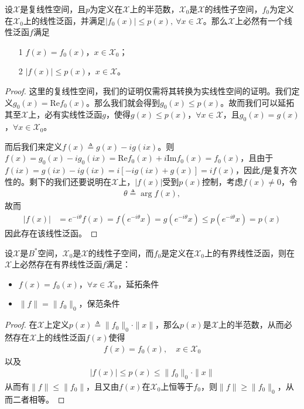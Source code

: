 \begin{theorem}
    设$\mathscr{X}$是复线性空间，且$p$为定义在$\mathscr{X}$上的半范数，$\mathscr{X}_0$是$\mathscr{X}$的线性子空间，$f_0$为定义在$\mathscr{X}_0$上的线性泛函，并满足$|f_0(x)| \leqslant p(x),\ \forall x\in\mathscr{X}$。那么$\mathscr{X}$上必然有一个线性泛函$f$满足
    \begin{itemize}
        \item[1] $f(x) = f_0(x)$，$x\in\mathscr{X}_0$；
        \item[2] $|f(x)| \leqslant p(x)$，$x\in\mathscr{X}$。
    \end{itemize}
\end{theorem}
\begin{proof}
    这里的复线性空间，我们的证明仅需将其转换为实线性空间的证明。我们定义$g_0(x) = \text{Re} f_0(x)$。那么我们就会得到$g_0(x)\leqslant p(x)$。故而我们可以延拓其至$\mathscr{X}$上，必有实线性泛函$g$，使得$g(x)\leqslant p(x)$，$\forall x\in\mathscr{X}$，且$g_0(x) = g(x)$，$\forall x\in \mathscr{X}_0$。

    而后我们来定义$f(x)\triangleq g(x) - ig(ix)$。则$f(x) = g_0(x) - ig_0(ix) = \text{Re}f_0(x) + i\text{Im}f_0(x) = f_0(x)$，且由于$f(ix) = g(ix) - ig(ix) = i[-ig(ix) + g(x)] = if(x)$，因此$f$是复齐次性的。剩下的我们还要说明在$\mathscr{X}$上，$|f(x)|$受到$p(x)$控制，考虑$f(x)\neq 0$，令
    \begin{align*}
        \theta \triangleq \arg f(x),
    \end{align*}
    故而
    \begin{align*}
        |f(x)| &= e^{-i\theta} f(x) = f(e^{-i\theta}x) = g(e^{-i\theta}x) \leqslant p(e^{-i\theta} x) = p(x)
    \end{align*}
    因此存在该线性泛函。
\end{proof}



\begin{theorem}
    设$\mathscr{X}$是$B^*$空间，$\mathscr{X}_0$是$\mathscr{X}$的线性子空间，而$f_0$是定义在$\mathscr{X}_0$上的有界线性泛函，则在$\mathscr{X}$上必然存在有界线性泛函$f$满足：
    \begin{itemize}
        \item $f(x) = f_0(x)$，$\forall x\in\mathscr{X}_0$，延拓条件
        \item $\|f\| = \|f_0\|_0$，保范条件
    \end{itemize}
\end{theorem}
\begin{proof}
    在$\mathscr{X}$上定义$p(x)\triangleq \|f_0\|_0 \cdot\|x\|$，那么$p(x)$是$\mathscr{X}$上的半范数，从而必然存在$\mathscr{X}$上的线性泛函$f(x)$使得
    \begin{align*}
        f(x) = f_0(x),\quad x\in\mathscr{X}_0
    \end{align*}
    以及
    \begin{align*}
        |f(x)|\leqslant p(x) \leqslant \|f_0\|_0 \cdot\|x\| 
    \end{align*}
    从而有$\|f\|\leqslant \|f_0\|$，且又由$f(x)$在$\mathscr{X}_0$上恒等于$f_0$，则$\|f\|\geqslant \|f_0\|_0$，从而二者相等。
\end{proof}

\begin{theorem}
    
\end{theorem}









